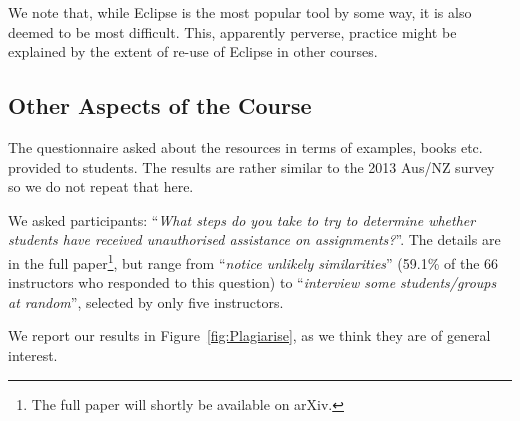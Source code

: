 \documentclass{sig-alternate}
\begin{document}
We note that, while Eclipse is the most popular tool by some way, it
is also deemed to be most difficult. This, apparently perverse,
practice might be explained by the extent of re-use of Eclipse in
other courses.



\subsection{Other Aspects of the Course}
\iffalse
\subsubsection{External Delivery}
\begin{figure}
\begin{center}
{Steps.tex}
\end{center}\vskip-18pt
\caption{Steps taken to determine whether students have received unauthorised assistance on assignments.\label{fig:Plagiarise}}
\end{figure}
\subsubsection{Resources provided to students}
\fi
The questionnaire asked about the resources in terms of examples,
books etc. provided to students. The results are rather similar to the
2013 Aus/NZ survey~\cite[Figure 14]{mason+cooper:2014} so we do not
repeat that here.

We asked participants: ``{\emph{What steps do you take to try to
determine whether students have received unauthorised assistance on
assignments?}}''. The details are in the full paper\footnote{The full
paper will shortly be available on arXiv.}, but range from
``{\emph{notice unlikely similarities}}'' (59.1\% of the 66
instructors who responded to this question) to ``{\emph{interview some
students/groups at random}}'', selected by only five instructors.


\iffalse
We report our results in Figure~\ref{fig:Plagiarise}, as we think they
are of general interest.
\end{document}
